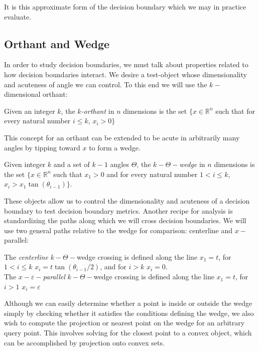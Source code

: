 It is this approximate form of the decision boundary which we may in
practice evaluate. 

\subsection{Orthant and Wedge}

In order to study decision boundaries, we must talk about properties
related to how decision boundaries interact. We desire a test-object
whose dimensionality and acuteness of angle we can control. To this
end we will use the $k-$dimensional orthant:

\begin{definition}
  Given an integer $k$, the \emph{$k$-orthant} in $n$ dimensions is the set $\{x \in \mathbb{R}^{n}$
  such that for every natural number $i \leq k$, $x_i > 0\}$
  \end{definition}

This concept for an orthant can be extended to be acute in arbitrarily
many angles by tipping toward $x$ to form a wedge.

\begin{definition}
  Given integer $k$ and a set of $k-1$ angles $\Theta$, the \emph{$k-\Theta-$wedge} in $n$ dimensions is the set $\{x \in \mathbb{R}^{n}$
  such that $x_1 > 0$ and for every natural number $1 < i \leq k$,
  $x_i > x_1 \tan(\theta_{i-1})\}$. 
  \end{definition}

These objects allow us to control the dimensionality and acuteness of
a decision boundary to test decision boundary metrics. Another recipe
for analysis is standardizing the paths along which we will cross
decision boundaries. We will use two general paths relative to the
wedge for comparison: centerline and $x-$parallel:

\begin{definition}
  The \emph{centerline} $k-\Theta-$wedge crossing is defined along
  the line $x_1 = t$, for $1 < i \leq k$ $x_i = t
  \tan(\theta_{i-1}/2)$, and for $i > k$ $x_i = 0$.\\

  The \emph{$x-\varepsilon-$parallel} $k-\Theta-$wedge crossing is defined along
  the line $x_1 = t$, for $i > 1$ $x_i = \varepsilon$
\end{definition}

Although we can easily determine whether a point is inside or outside
the wedge simply by checking whether it satisfies the conditions
defining the wedge, we also wish to compute the projection or nearest
point on the wedge for an arbitrary query point. This involves solving
for the closest point to a convex object, which can be accomplished by
projection onto convex sets. 

